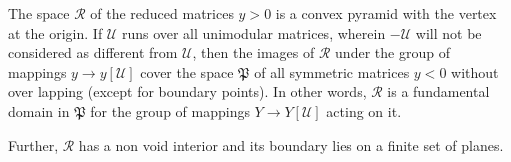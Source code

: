\setcounter{thm}{1}
\begin{thm}\label{chap3:thm2}%
 The space $ \mathscr{R} $ of the reduced matrices  $y> 0
   $ is a convex pyramid with the vertex at the origin. If
   $\mathcal{U}$ runs over all unimodular  matrices, wherein
   $-\mathcal{U}$ will not be considered as different from
   $\mathcal{U}$, then the images of $\mathscr{R}$ under the group of
   mappings $y \rightarrow y [ \mathcal{U} ] $ cover the space $
   \mathfrak{P} $ of all symmetric matrices  $y
  < 0 $ without over  lapping (except for boundary points). In
  other words, $ \mathscr{R}$ is  a fundamental domain in $
  \mathfrak{P} $ for the group  of mappings  $ Y \rightarrow Y [
    \mathcal{U} ] $ acting on it. 
  
Further, $\mathscr{R}$ has a non void interior and its
  boundary lies on a finite set of planes. 
 \end{thm} 

